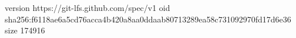 version https://git-lfs.github.com/spec/v1
oid sha256:f6118ae6a5cd76acca4b420a8aa0ddaab80713289ea58c731092970fd17d6e36
size 174916
